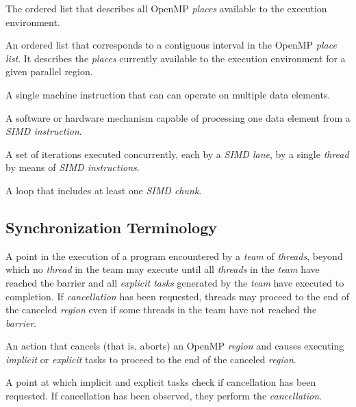\glossarydefstart
The ordered list that describes all OpenMP \emph{places} available to the execution 
environment.
\glossarydefend

\glossarydefstart
An ordered list that corresponds to a contiguous interval in the OpenMP \emph{place list}. 
It describes the \emph{places} currently available to the execution environment for a given 
parallel region.
\glossarydefend

\glossarydefstart
A single machine instruction that can can operate on multiple data elements.
\glossarydefend

\glossarydefstart
A software or hardware mechanism capable of processing one data element from a 
\emph{SIMD instruction}.
\glossarydefend

\glossarydefstart
A set of iterations executed concurrently, each by a \emph{SIMD lane}, by a single \emph{thread}
by means of \emph{SIMD instructions}.
\glossarydefend

\glossarydefstart
A loop that includes at least one \emph{SIMD chunk}.
\glossarydefend








\subsection{Synchronization Terminology}
\glossarydefstart
A point in the execution of a program encountered by a \emph{team} of \emph{threads}, beyond 
which no \emph{thread} in the team may execute until all \emph{threads} in the \emph{team} have 
reached the barrier and all \emph{explicit tasks} generated by the \emph{team} have executed to 
completion. If \emph{cancellation} has been requested, threads may proceed to the end of 
the canceled \emph{region} even if some threads in the team have not reached the \emph{barrier}.
\glossarydefend

\glossarydefstart
An action that cancels (that is, aborts) an OpenMP \emph{region} and causes executing 
\emph{implicit} or \emph{explicit} tasks to proceed to the end of the canceled \emph{region}. 
\glossarydefend

\glossarydefstart
A point at which implicit and explicit tasks check if cancellation has been 
requested. If cancellation has been observed, they perform the \emph{cancellation}. 

